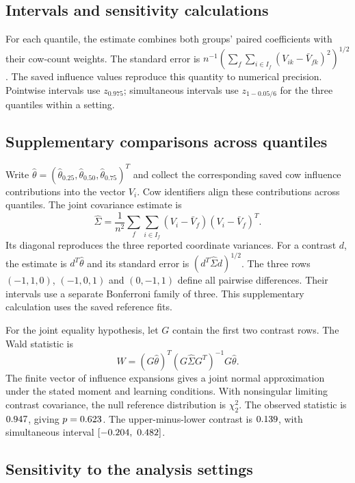 \subsection{Intervals and sensitivity calculations}

For each quantile, the estimate combines both groups' paired
coefficients with their cow-count weights. The standard error is
$n^{-1}(\sum_f\sum_{i\in I_f}(V_{ik}-\bar V_{fk})^2)^{1/2}$.
The saved influence values reproduce this quantity to numerical
precision. Pointwise intervals use $z_{0.975}$; simultaneous
intervals use $z_{1-0.05/6}$ for the three quantiles within a setting.

\subsection{Supplementary comparisons across quantiles}

Write $\widehat\theta=(\widehat\theta_{0.25},
\widehat\theta_{0.50},\widehat\theta_{0.75})^T$ and collect the
corresponding saved cow influence contributions into the vector
$V_i$. Cow identifiers align these contributions across quantiles.
The joint covariance estimate is
\[
 \widehat\Sigma=\frac1{n^2}\sum_f\sum_{i\in I_f}
 (V_i-\bar V_f)(V_i-\bar V_f)^T.
\]
Its diagonal reproduces the three reported coordinate variances.
For a contrast $d$, the estimate is $d^T\widehat\theta$ and its
standard error is $(d^T\widehat\Sigma d)^{1/2}$. The three rows
$(-1,1,0)$, $(-1,0,1)$ and $(0,-1,1)$ define all pairwise differences.
Their intervals use a separate Bonferroni family of three.
This supplementary calculation uses the saved reference fits.

For the joint equality hypothesis, let $G$ contain the first two
contrast rows. The Wald statistic is
\[
 W=(G\widehat\theta)^T(G\widehat\Sigma G^T)^{-1}G\widehat\theta.
\]
The finite vector of influence expansions gives a joint normal
approximation under the stated moment and learning conditions.
With nonsingular limiting contrast covariance, the null reference
distribution is $\chi^2_2$. The observed statistic is
$0.947{}$, giving $p=0.623{}$.
The upper-minus-lower contrast is $0.139{}$,
with simultaneous interval $[-0.204,\ 0.482]{}$.



\subsection{Sensitivity to the analysis settings}

